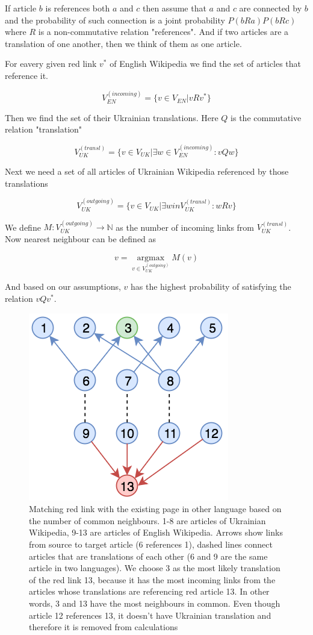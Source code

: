 \documentclass[11pt,a4paper]{article}
\begin{document}
If article $b$ is references both $a$ and $c$ then assume that $a$ and $c$ are connected by $b$ and the probability of such connection is a joint probability $P(bRa)P(bRc)$ where $R$ is a non-commutative relation "references". And if two articles are a translation of one another, then we think of them as one article.

For eavery given red link $v^{*}$ of English Wikipedia we find the set of articles that reference it.

\[ V_{EN}^{(incoming)} = \{ v \in V_{EN} | vRv^{*} \} \]

Then we find the set of their Ukrainian translations. Here $Q$ is the commutative relation "translation"

\[ V_{UK}^{(transl)} = \{ v \in V_{UK} | \exists w \in V_{EN}^{(incoming)} : vQw \} \]

Next we need a set of all articles of Ukrainian Wikipedia referenced by those translations

\[ V_{UK}^{(outgoing)} = \{ v \in V_{UK} | \exists w in V_{UK}^{(transl)} : wRv \} \]

We define $M: V_{UK}^{(outgoing)} \to \mathbb{N}$ as the number of incoming links from $V_{UK}^{(transl)}$. Now nearest neighbour can be defined as

\[ v = \operatorname*{argmax}_{v \in V_{UK}^{(outgoing)}} M(v) \]

And based on our assumptions, $v$ has the highest probability of satisfying the relation $vQv^{*}$.


\begin{figure}[H]
  \label{fig:graph}
  \begin{center}
  \includegraphics[width=0.36\linewidth]{img/graph}
  \caption{Matching red link with the existing page in other language based on the number of common neighbours. 1-8 are articles of Ukrainian Wikipedia, 9-13 are articles of English Wikipedia. Arrows show links from source to target article (6 references 1), dashed lines connect articles that are translations of each other (6 and 9 are the same article in two languages). We choose 3 as the most likely translation of the red link 13, because it has the most incoming links from the articles whose translations are referencing red article 13. In other words, 3 and 13 have the most neighbours in common. Even though article 12 references 13, it doesn't have Ukrainian translation and therefore it is removed from calculations}
  \end{center}
\end{figure}
\end{document}
